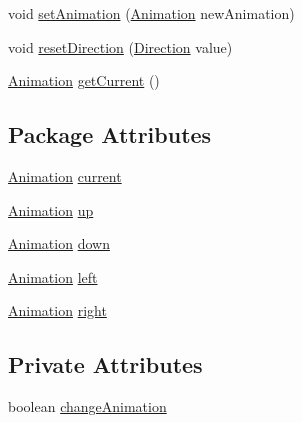 \begin{DoxyCompactItemize}
\item 
void \mbox{\hyperlink{classentities_1_1_animated_sprite_entity_a089bd746df0d8a9d5687240bb34af2dc}{set\+Animation}} (\mbox{\hyperlink{classorg_1_1newdawn_1_1slick_1_1_animation}{Animation}} new\+Animation)
\item 
void \mbox{\hyperlink{classentities_1_1_animated_sprite_entity_aa0c03e8354889e4e8dd9caccf2c43d48}{reset\+Direction}} (\mbox{\hyperlink{enumentities_1_1_direction}{Direction}} value)
\item 
\mbox{\hyperlink{classorg_1_1newdawn_1_1slick_1_1_animation}{Animation}} \mbox{\hyperlink{classentities_1_1_animated_sprite_entity_a49847fd77527b5805401b6900a4b0633}{get\+Current}} ()
\end{DoxyCompactItemize}
\subsection*{Package Attributes}
\begin{DoxyCompactItemize}
\item 
\mbox{\hyperlink{classorg_1_1newdawn_1_1slick_1_1_animation}{Animation}} \mbox{\hyperlink{classentities_1_1_animated_sprite_entity_ab44999a4be67c7ce81f4da6b5d333ce5}{current}}
\item 
\mbox{\hyperlink{classorg_1_1newdawn_1_1slick_1_1_animation}{Animation}} \mbox{\hyperlink{classentities_1_1_animated_sprite_entity_aa3f0c36879bc4afe3d25f744f357b5b6}{up}}
\item 
\mbox{\hyperlink{classorg_1_1newdawn_1_1slick_1_1_animation}{Animation}} \mbox{\hyperlink{classentities_1_1_animated_sprite_entity_a770f7c34cd976991f59b6701d670d974}{down}}
\item 
\mbox{\hyperlink{classorg_1_1newdawn_1_1slick_1_1_animation}{Animation}} \mbox{\hyperlink{classentities_1_1_animated_sprite_entity_ae706cd48f3aeb5cac587490c5317553d}{left}}
\item 
\mbox{\hyperlink{classorg_1_1newdawn_1_1slick_1_1_animation}{Animation}} \mbox{\hyperlink{classentities_1_1_animated_sprite_entity_acae197ec16525f140d7285eec19e18da}{right}}
\end{DoxyCompactItemize}
\subsection*{Private Attributes}
\begin{DoxyCompactItemize}
\item 
boolean \mbox{\hyperlink{classentities_1_1_animated_sprite_entity_ac5b06797e6a716cb04b883d92301fabf}{change\+Animation}}
\end{DoxyCompactItemize}
